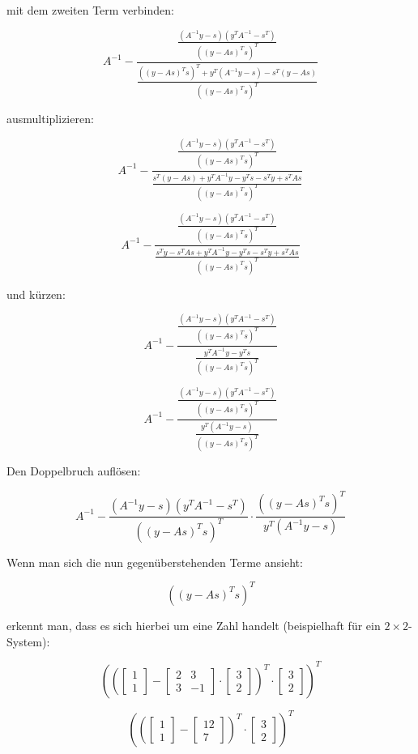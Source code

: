 \documentclass[a4paper, 12pt]{report}
\begin{document}
mit dem zweiten Term verbinden:

$$ A^{-1} - \frac{ \frac{ (A^{-1}y-s)(y^TA^{-1}-s^T) }{\left( (y-As)^Ts\right)^T } }{ \frac{ \left( (y-As)^Ts\right)^T + y^T(A^{-1}y - s) - s^T(y - As) }{\left( (y-As)^Ts\right)^T}}$$

ausmultiplizieren:

$$ A^{-1} - \frac{ \frac{ (A^{-1}y-s)(y^TA^{-1}-s^T) }{\left( (y-As)^Ts\right)^T } }{ \frac{ s^T(y - As) + y^TA^{-1}y - y^Ts - s^Ty + s^TAs }{\left( (y-As)^Ts\right)^T}}$$

$$ A^{-1} - \frac{ \frac{ (A^{-1}y-s)(y^TA^{-1}-s^T) }{\left( (y-As)^Ts\right)^T } }{ \frac{ s^Ty - s^TAs + y^TA^{-1}y - y^Ts - s^Ty + s^TAs }{\left( (y-As)^Ts\right)^T}}$$

und kürzen:

$$ A^{-1} - \frac{ \frac{ (A^{-1}y-s)(y^TA^{-1}-s^T) }{\left( (y-As)^Ts\right)^T } }{ \frac{ y^TA^{-1}y - y^Ts }{\left( (y-As)^Ts\right)^T}}$$

$$ A^{-1} - \frac{ \frac{ (A^{-1}y-s)(y^TA^{-1}-s^T) }{\left( (y-As)^Ts\right)^T } }{ \frac{ y^T(A^{-1}y - s) }{\left( (y-As)^Ts\right)^T}}$$

Den Doppelbruch auflösen:

$$ A^{-1} - \frac{ (A^{-1}y-s)(y^TA^{-1}-s^T) }{\left( (y-As)^Ts\right)^T } \cdot \frac{ \left( (y-As)^Ts\right)^T }{ y^T(A^{-1}y - s) }$$

Wenn man sich die nun gegenüberstehenden Terme ansieht:

$$\left( (y-As)^Ts\right)^T$$

erkennt man, dass es sich hierbei um eine Zahl handelt (beispielhaft für ein $2\times 2$-System):

$$\left( \left(\begin{bmatrix}1\\1\end{bmatrix} - \begin{bmatrix}2 & 3\\3 & -1\end{bmatrix}\cdot \begin{bmatrix}3\\2\end{bmatrix} \right)^T\cdot \begin{bmatrix}3\\2\end{bmatrix} \right)^T$$

$$\left( \left(\begin{bmatrix}1\\1\end{bmatrix} - \begin{bmatrix}12\\7\end{bmatrix} \right)^T \cdot \begin{bmatrix}3\\2\end{bmatrix} \right)^T$$
\end{document}
